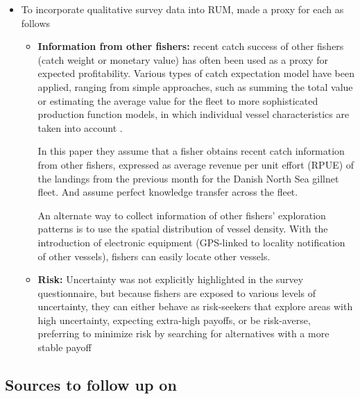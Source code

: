\documentclass[a4paper,10pt]{report}
\begin{document}
\begin{itemize}
\item To incorporate qualitative survey data into RUM, made a proxy for each as follows
\begin{itemize}
\item {\bf Information from other fishers:} recent catch success of other fishers (catch weight or monetary value) has often been used as a proxy for expected profitability. Various types of catch expectation model have been applied, ranging from simple approaches, such as summing the total value or estimating the average value for the fleet \citep{BockstaelOpaluch:1983,Vermardetal:2008} to more sophisticated production function models, in which individual vessel characteristics are taken into account \citep{HollandSutinen:2000}. 

In this paper they assume that a fisher obtains recent catch information from other fishers, expressed as average revenue per unit effort (RPUE) of the landings from the previous month for the Danish North Sea gillnet fleet. And assume perfect knowledge transfer across the fleet. 

An alternate way to collect information of other fishers' exploration patterns is to use the spatial distribution of vessel density. With the introduction of electronic equipment (GPS-linked to locality notification of other vessels), fishers can easily locate other vessels. 
\item {\bf Risk:} Uncertainty was not explicitly highlighted in the survey questionnaire, but because fishers are exposed to various levels of uncertainty, they can either behave as risk-seekers that explore areas with high uncertainty, expecting extra-high payoffs, or be risk-averse, preferring to minimize risk by searching for alternatives with a more stable payoff \citep{EggertTveteras:2004,MistiaenStrand:2000}
\end{itemize}
\end{itemize}

\subsection*{Sources to follow up on}



\end{document}
